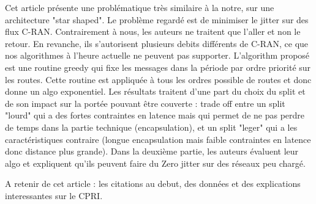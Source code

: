 \documentclass[a4paper,10pt]{article}
\begin{document}
   
  \cite{chitimalla20175g}
  
 
Cet article présente une problématique très similaire à la notre, sur une architecture "star shaped". Le problème regardé est de minimiser le jitter sur des flux C-RAN. Contrairement à nous, les auteurs ne traitent que l'aller et non le retour. En revanche, ils s'autorisent plusieurs debits différents de C-RAN, ce que nos algorithmes à l'heure actuelle ne peuvent pas supporter.
L'algorithm proposé est une routine greedy qui fixe les messages dans la période par ordre priorité sur les routes. Cette routine est appliquée à tous les ordres possible de routes et donc donne un algo exponentiel.
Les résultats traitent d'une part du choix du split et de son impact sur la portée pouvant être couverte : trade off entre un split "lourd" qui a des fortes contraintes en latence mais qui permet de ne pas perdre de temps dans la partie technique (encapsulation), et un split "leger" qui a les caractéristiques contraire (longue encapsulation mais faible contraintes en latence donc distance plus grande).
Dans la deuxième partie, les auteurs évaluent leur algo et expliquent qu'ils peuvent faire du Zero jitter sur des réseaux peu chargé.

A retenir de cet article : les citations au debut, des données et des explications interessantes sur le CPRI.
    
\end{document}
